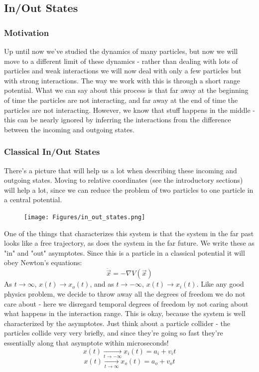 \documentclass{article}
\begin{document}
\subsection{In/Out States}
\subsubsection{Motivation}
Up until now we've studied the dynamics of many particles, but now we will move to a different limit of these dynamics - rather than dealing with lots of particles and weak interactions we will now deal with only a few particles but with strong interactions. The way we work with this is through a short range potential. What we can say about this process is that far away at the beginning of time the particles are not interacting, and far away at the end of time the particles are not interacting. However, we know that stuff happens in the middle - this can be nearly ignored by inferring the interactions from the difference between the incoming and outgoing states.

\subsubsection{Classical In/Out States}
There's a picture that will help us a lot when describing these incoming and outgoing states. Moving to relative coordinates (see the introductory sections) will help a lot, since we can reduce the problem of two particles to one particle in a central potential.
\begin{figure}[ht]
    \centering
    \texttt{[image: Figures/in\_out\_states.png]}
    \caption*{}
    \label{fig:in_out_states}
\end{figure}
One of the things that characterizes this system is that the system in the far past looks like a free trajectory, as does the system in the far future. We write these as "in" and "out" asymptotes. Since this is a particle in a classical potential it will obey Newton's equations:
\begin{equation}\ddot{\vec{x}} = -\nabla V(\vec{x})\end{equation}
As $t \to \infty$, $x(t) \to x_o(t)$, and as $t \to -\infty$, $x(t)\to x_i(t)$. Like any good physics problem, we decide to throw away all the degrees of freedom we do not care about - here we disregard temporal degrees of freedom by not caring about what happens in the interaction range. This is okay, because the system is well characterized by the asymptotes. Just think about a particle collider - the particles collide very very briefly, and since they're going so fast they're essentially along that asymptote within microseconds!
\[x(t) \xrightarrow[t\to -\infty]{} x_i(t) = a_i + v_i t\]
\[x(t) \xrightarrow[t\to \infty]{} x_o(t) = a_o + v_o t\]
\end{document}
